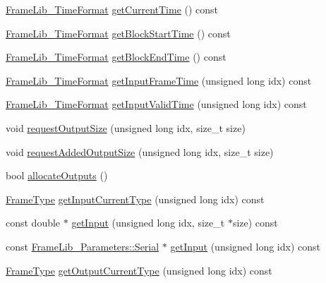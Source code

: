 \begin{DoxyCompactItemize}
\item 
\hyperlink{struct_frame_lib___time_format}{Frame\+Lib\+\_\+\+Time\+Format} \hyperlink{class_frame_lib___d_s_p_a5734f973e603be4a85764d5f77fa4004}{get\+Current\+Time} () const
\item 
\hyperlink{struct_frame_lib___time_format}{Frame\+Lib\+\_\+\+Time\+Format} \hyperlink{class_frame_lib___d_s_p_a9c34c56420ff9da196150e8a5307e812}{get\+Block\+Start\+Time} () const
\item 
\hyperlink{struct_frame_lib___time_format}{Frame\+Lib\+\_\+\+Time\+Format} \hyperlink{class_frame_lib___d_s_p_a8cd169b635307807b29f1d02ea23635e}{get\+Block\+End\+Time} () const
\item 
\hyperlink{struct_frame_lib___time_format}{Frame\+Lib\+\_\+\+Time\+Format} \hyperlink{class_frame_lib___d_s_p_a705ddc874bc5643f81a0f71894f1ae0c}{get\+Input\+Frame\+Time} (unsigned long idx) const
\item 
\hyperlink{struct_frame_lib___time_format}{Frame\+Lib\+\_\+\+Time\+Format} \hyperlink{class_frame_lib___d_s_p_a699dda68553ddebd5ca8c70326fb40a5}{get\+Input\+Valid\+Time} (unsigned long idx) const
\item 
void \hyperlink{class_frame_lib___d_s_p_a018be5346f473c3c21d5251d6acb85c7}{request\+Output\+Size} (unsigned long idx, size\+\_\+t size)
\item 
void \hyperlink{class_frame_lib___d_s_p_a7716bc548b4418d6951dbbada499d9d3}{request\+Added\+Output\+Size} (unsigned long idx, size\+\_\+t size)
\item 
bool \hyperlink{class_frame_lib___d_s_p_abbf404ed95c61cfa713c988b10f76202}{allocate\+Outputs} ()
\item 
\hyperlink{_frame_lib___types_8h_ad495a9f61af7fff07d7e97979d1ab854}{Frame\+Type} \hyperlink{class_frame_lib___d_s_p_aba80b7c3546f6e65ab0378628dd2be62}{get\+Input\+Current\+Type} (unsigned long idx) const
\item 
const double $\ast$ \hyperlink{class_frame_lib___d_s_p_aea9dee37e1093a12f7764b12ab430a19}{get\+Input} (unsigned long idx, size\+\_\+t $\ast$size) const
\item 
const \hyperlink{class_frame_lib___parameters_1_1_serial}{Frame\+Lib\+\_\+\+Parameters\+::\+Serial} $\ast$ \hyperlink{class_frame_lib___d_s_p_ae2d4474b0545fcc2cbb5ffcfcf75fc94}{get\+Input} (unsigned long idx) const
\item 
\hyperlink{_frame_lib___types_8h_ad495a9f61af7fff07d7e97979d1ab854}{Frame\+Type} \hyperlink{class_frame_lib___d_s_p_ad870d652a2ce82ca2dee8eba91ad8dd8}{get\+Output\+Current\+Type} (unsigned long idx) const

\end{DoxyCompactItemize}
